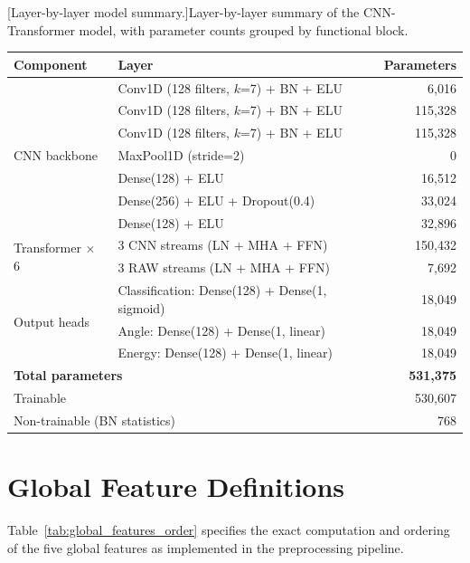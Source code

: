 \begin{center}
\begin{minipage}{\linewidth}
\centering
{}[Layer-by-layer model summary.]{Layer-by-layer summary of the CNN-Transformer model, with parameter counts grouped by functional block.}
\label{tab:model_layers}
\small
\setlength{\tabcolsep}{6pt}
\renewcommand{\arraystretch}{1.05}
\begin{tabular}{llr}
\toprule
\textbf{Component} & \textbf{Layer} & \textbf{Parameters} \\
\midrule
\multirow{7}{*}{CNN backbone}
  & Conv1D (128 filters, $k$=7) + BN + ELU & 6,016 \\
  & Conv1D (128 filters, $k$=7) + BN + ELU & 115,328 \\
  & Conv1D (128 filters, $k$=7) + BN + ELU & 115,328 \\
  & MaxPool1D (stride=2) & 0 \\
  & Dense(128) + ELU & 16,512 \\
  & Dense(256) + ELU + Dropout(0.4) & 33,024 \\
  & Dense(128) + ELU & 32,896 \\
\midrule
\multirow{2}{*}{Transformer $\times$ 6}
  & 3 CNN streams (LN + MHA + FFN) & 150,432 \\
  & 3 RAW streams (LN + MHA + FFN) & 7,692 \\
\midrule
\multirow{3}{*}{Output heads}
  & Classification: Dense(128) + Dense(1, sigmoid) & 18,049 \\
  & Angle: Dense(128) + Dense(1, linear) & 18,049 \\
  & Energy: Dense(128) + Dense(1, linear) & 18,049 \\
\midrule
\multicolumn{2}{l}{\textbf{Total parameters}} & \textbf{531,375} \\
\multicolumn{2}{l}{\quad Trainable} & 530,607 \\
\multicolumn{2}{l}{\quad Non-trainable (BN statistics)} & 768 \\
\bottomrule
\end{tabular}
\end{minipage}
\end{center}

\section{Global Feature Definitions} \label{sec:apx_global_features}

Table~\ref{tab:global_features_order} specifies the exact computation and ordering of the five global features as implemented in the preprocessing pipeline.

